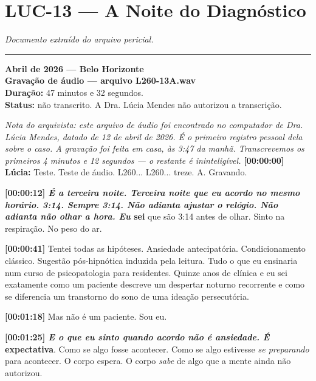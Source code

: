\section*{\textbf{LUC-13} --- A Noite do Diagnóstico}

\noindent \textit{Documento extraído do arquivo pericial.}

\vspace{0.5em}\noindent\rule{\textwidth}{0.5pt}\vspace{0.5em}

\noindent \textbf{Abril de 2026 --- Belo Horizonte}\\
\noindent \textbf{Gravação de áudio --- arquivo L260-13A.wav}\\
\noindent \textbf{Duração:} 47 minutos e 32 segundos.\\
\noindent \textbf{Status:} não transcrito. A Dra. Lúcia Mendes não autorizou a transcrição.

\noindent \textit{Nota do arquivista: este arquivo de áudio foi encontrado no computador de Dra. Lúcia Mendes, datado de 12 de abril de 2026. É o primeiro registro pessoal dela sobre o caso. A gravação foi feita em casa, às 3:47 da manhã. Transcrevemos os primeiros 4 minutos e 12 segundos --- o restante é ininteligível.}
\noindent \textbf{[00:00:00] Lúcia:} Teste. Teste de áudio. L260... L260... treze. A. Gravando.

\noindent \textbf{[00:00:12]\textit{ É a terceira noite. Terceira noite que eu acordo no mesmo horário. 3:14. Sempre 3:14. Não adianta ajustar o relógio. Não adianta não olhar a hora. Eu }sei} que são 3:14 antes de olhar. Sinto na respiração. No peso do ar.

\noindent \textbf{[00:00:41]} Tentei todas as hipóteses. Ansiedade antecipatória. Condicionamento clássico. Sugestão pós-hipnótica induzida pela leitura. Tudo o que eu ensinaria num curso de psicopatologia para residentes. Quinze anos de clínica e eu sei exatamente como um paciente descreve um despertar noturno recorrente e como se diferencia um transtorno do sono de uma ideação persecutória.

\noindent \textbf{[00:01:18]} Mas não é um paciente. Sou eu.

\noindent \textbf{[00:01:25]\textit{ E o que eu sinto quando acordo não é ansiedade. É }expectativa}. Como se algo fosse acontecer. Como se algo estivesse \textit{se preparando} para acontecer. O corpo espera. O corpo \textit{sabe} de algo que a mente ainda não autorizou.

